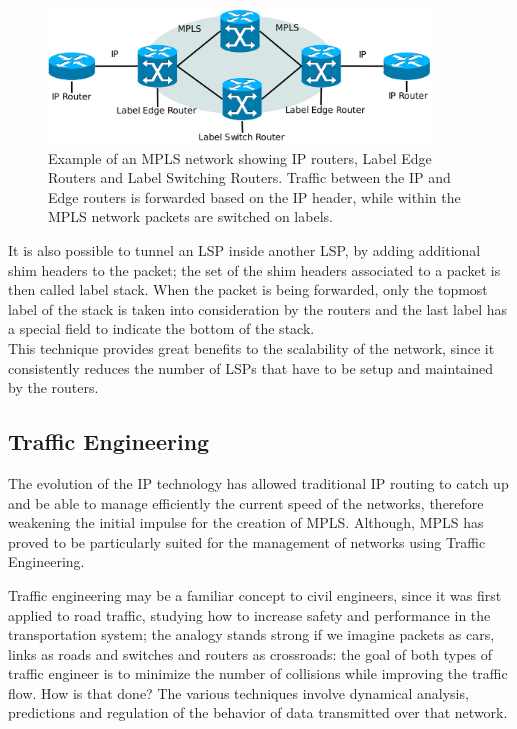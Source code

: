 \documentclass[10pt,a4paper]{report}
\begin{document}
\begin{figure}[!hbp]
  \centering
  \includegraphics[width=0.9\textwidth]{img/mpls_net}
  \caption[MPLS network]{Example of an MPLS network showing IP
    routers, Label Edge Routers and Label Switching Routers. Traffic
    between the IP and Edge routers is forwarded based on the IP
    header, while within the MPLS network packets are switched on
    labels.}
  \label{fig:mpls_net}
\end{figure}

\newpage

It is also possible to tunnel an LSP inside another LSP, by adding
additional shim headers to the packet; the set of the shim headers
associated to a packet is then called label stack. When the packet is
being forwarded, only the topmost label of the stack is taken into
consideration by the routers and the last label has a special field to
indicate the bottom of the stack. \\
This technique provides great benefits to the scalability of the
network, since it consistently reduces the number of LSPs that have to
be setup and maintained by the routers.

\subsection{Traffic Engineering}
The evolution of the IP technology has allowed traditional IP routing
to catch up and be able to manage efficiently the current speed of the
networks, therefore weakening the initial impulse for the creation of
MPLS. Although, MPLS has proved to be particularly suited for the
management of networks using Traffic Engineering.

Traffic engineering may be a familiar concept to civil engineers,
since it was first applied to road traffic, studying how to increase
safety and performance in the transportation system; the analogy
stands strong if we imagine packets as cars, links as roads and
switches and routers as crossroads: the goal of both types of traffic
engineer is to minimize the number of collisions while improving the
traffic flow. How is that done? The various techniques involve
dynamical analysis, predictions and regulation of the behavior of data
transmitted over that network. 
\end{document}
